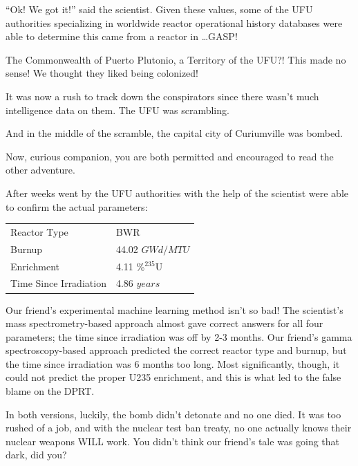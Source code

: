 {{\begin{minipage}[t]{0.45\textwidth}
    ``Ok! We got it!'' said the scientist. Given these values, some of the UFU
    authorities specializing in worldwide reactor operational history databases
    were able to determine this came from a reactor in \ldots GASP! 

    The Commonwealth of Puerto Plutonio, a Territory of the UFU?! This made no
    sense! We thought they liked being colonized!

    It was now a rush to track down the conspirators since there wasn't much
    intelligence data on them. The UFU was scrambling. 

    And in the middle of the scramble, the capital city of Curiumville was
    bombed.
  
  \end{minipage}
}

\vspace{4mm}

\narr Now, curious companion, you are both permitted and encouraged to read the
other adventure. 

After weeks went by the UFU authorities with the help of the scientist were
able to confirm the actual parameters:
\begin{table}[H]
  \centering
  \begin{tabular}{ll} \toprule
    Reactor Type           & BWR                        \\
    Burnup                 & 44.02 $GWd/MTU$            \\
    Enrichment             & 4.11 \%${}^{235}\text{U}$  \\
    Time Since Irradiation & 4.86 $years$               \\ \bottomrule
  \end{tabular}
\end{table}

Our friend's experimental machine learning method isn't so bad! The scientist's
mass spectrometry-based approach almost gave correct answers for all four
parameters; the time since irradiation was off by 2-3 months.  Our friend's
gamma spectroscopy-based approach predicted the correct reactor type and
burnup, but the time since irradiation was 6 months too long. Most
significantly, though, it could not predict the proper \gls{U235} enrichment,
and this is what led to the false blame on the DPRT.  

In both versions, luckily, the bomb didn't detonate and no one died. It was too
rushed of a job, and with the nuclear test ban treaty, no one actually knows
their nuclear weapons WILL work. You didn't think our friend's tale was going
that dark, did you?

}
